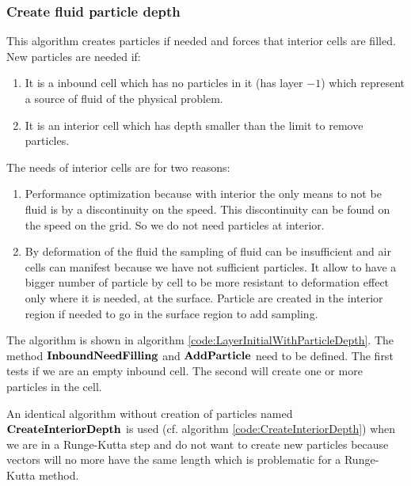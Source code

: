 \subsubsection{Create fluid particle depth}

This algorithm creates particles if needed and forces that interior cells are filled.
New particles are needed if:
\begin{enumerate}
\item It is a inbound cell which has no particles in it (has layer $-1$) which represent a source of fluid of the physical problem.
\item It is an interior cell which has depth smaller than the limit to remove particles.
\end{enumerate}

The needs of interior cells are for two reasons:
\begin{enumerate}
 \item Performance optimization because with interior the only means to not be fluid is by a discontinuity on the speed.
 This discontinuity can be found on the speed on the grid. So we do not need particles at interior.
 \item By deformation of the fluid the sampling of fluid can be insufficient and air cells can manifest because we have not sufficient particles.
 It allow to have a bigger number of particle by cell to be more resistant to deformation effect only where it is needed,
 at the surface. Particle are created in the interior region if needed to go in the surface region to add sampling.
\end{enumerate}

The algorithm is shown in algorithm \ref{code:LayerInitialWithParticleDepth}.
The method $\mathop{\textbf{InboundNeedFilling}}$ and $\mathop{\textbf{AddParticle}}$ need to be defined.
The first tests if we are an empty inbound cell. The second will create one or more particles in the cell.

An identical algorithm without creation of particles named $\mathop{\textbf{CreateInteriorDepth}}$
is used (cf. algorithm \ref{code:CreateInteriorDepth}) when we are in a Runge-Kutta step and do not want
to create new particles because vectors will no more have the same length which is problematic for a Runge-Kutta method.

